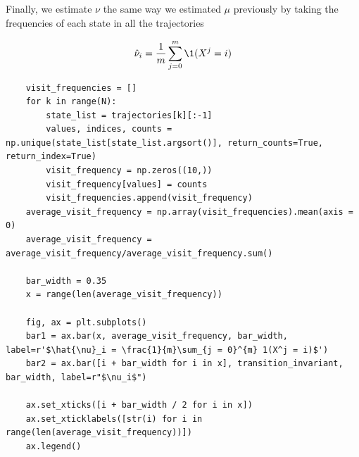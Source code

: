 Finally, we estimate $\nu$ the same way we estimated $\mu$ previously by taking the frequencies of each state in all the trajectories

\[ \hat{\nu}_i = \frac{1}{m}\sum_{j = 0}^{m} \1(X^j = i) \]

\begin{verbatim}
    visit_frequencies = []
    for k in range(N):
        state_list = trajectories[k][:-1]
        values, indices, counts = np.unique(state_list[state_list.argsort()], return_counts=True, return_index=True)
        visit_frequency = np.zeros((10,))
        visit_frequency[values] = counts
        visit_frequencies.append(visit_frequency)
    average_visit_frequency = np.array(visit_frequencies).mean(axis = 0)
    average_visit_frequency = average_visit_frequency/average_visit_frequency.sum()

    bar_width = 0.35
    x = range(len(average_visit_frequency))

    fig, ax = plt.subplots()
    bar1 = ax.bar(x, average_visit_frequency, bar_width, label=r'$\hat{\nu}_i = \frac{1}{m}\sum_{j = 0}^{m} 1(X^j = i)$')
    bar2 = ax.bar([i + bar_width for i in x], transition_invariant, bar_width, label=r"$\nu_i$")

    ax.set_xticks([i + bar_width / 2 for i in x])
    ax.set_xticklabels([str(i) for i in range(len(average_visit_frequency))])
    ax.legend()
\end{verbatim}

